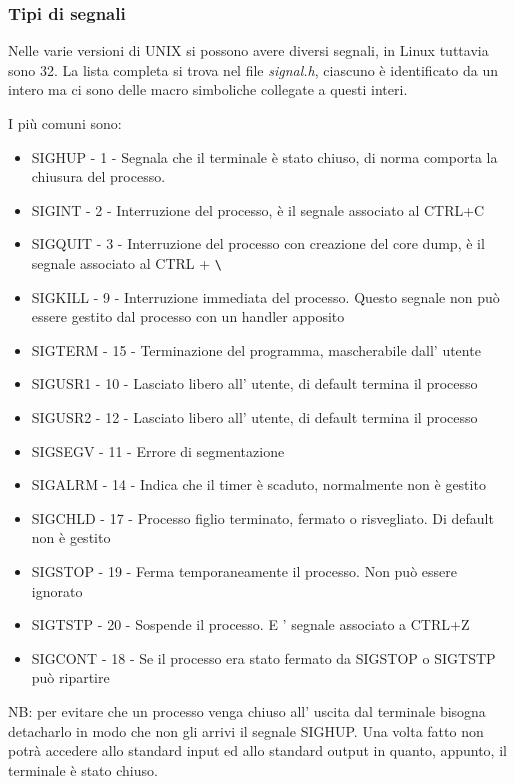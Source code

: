 \subsubsection{Tipi di segnali}
Nelle varie versioni di UNIX si possono avere diversi segnali, in Linux tuttavia sono 32.
La lista completa si trova nel file \emph{signal.h}, ciascuno è identificato da un intero ma ci sono delle macro simboliche collegate a questi interi.

I più comuni sono:
\begin{itemize}
    \item SIGHUP - 1 - Segnala che il terminale è stato chiuso, di norma comporta la chiusura del processo.
    \item SIGINT - 2 - Interruzione del processo, è il segnale associato al CTRL+C
    \item SIGQUIT - 3 - Interruzione del processo con creazione del core dump, è il segnale associato al CTRL + \verb{\{
    \item SIGKILL - 9 - Interruzione immediata del processo. Questo segnale non può essere gestito dal processo con un handler apposito
    \item SIGTERM - 15 - Terminazione del programma, mascherabile dall' utente
    \item SIGUSR1 - 10 - Lasciato libero all' utente, di default termina il processo
    \item SIGUSR2 - 12 - Lasciato libero all' utente, di default termina il processo
    \item SIGSEGV - 11 - Errore di segmentazione
    \item SIGALRM - 14 - Indica che il timer è scaduto, normalmente non è gestito
    \item SIGCHLD - 17 - Processo figlio terminato, fermato o risvegliato. Di default non è gestito
    \item SIGSTOP - 19 - Ferma temporaneamente il processo. Non può essere ignorato
    \item SIGTSTP - 20 - Sospende il processo. E ' segnale associato a CTRL+Z
    \item SIGCONT - 18 - Se il processo era stato fermato da SIGSTOP o SIGTSTP può ripartire
\end{itemize}
NB: per evitare che un processo venga chiuso all' uscita dal terminale bisogna detacharlo in modo che non gli arrivi il segnale SIGHUP.
Una volta fatto non potrà accedere allo standard input ed allo standard output in quanto, appunto, il terminale è stato chiuso.

